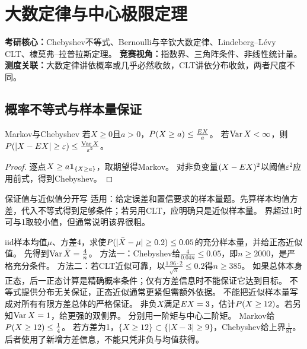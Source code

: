 \chapter{大数定律与中心极限定理}\label{ch:05}
\begin{examtip}
\textbf{考研核心：}Chebyshev不等式、Bernoulli与辛钦大数定律、Lindeberg--Lévy CLT、棣莫弗--拉普拉斯定理。
\textbf{竞赛视角：}指数界、三角阵条件、非线性统计量。
\textbf{测度关联：}大数定律讲依概率或几乎必然收敛，CLT讲依分布收敛，两者尺度不同。
\end{examtip}
\section{概率不等式与样本量保证}\label{sec:51}
\begin{theorem}{Markov与Chebyshev}
若$X\ge0$且$a>0$，$P(X\ge a)\le\frac{E X}{a}$。
若$\operatorname{Var} X<\infty$，则$P(|X-E X|\ge\varepsilon)\le\frac{\operatorname{Var} X}{\varepsilon^2}$。
\end{theorem}
\begin{proof}
逐点$X\ge a\mathbf1_{\{X\ge a\}}$，取期望得Markov。
对非负变量$(X-E X)^2$以阈值$\varepsilon^2$应用前式，得到Chebyshev。
\end{proof}
\begin{method}{保证值与近似值分开写}
适用：给定误差和置信要求的样本量题。先算样本均值方差，代入不等式得到足够条件；若另用CLT，应明确只是近似样本量。
界超过1时可与1取较小值，但通常说明该界很粗。
\end{method}
{iid样本均值$\mu$、方差4，求使$P(|\bar X-\mu|\ge0.2)\le0.05$的充分样本量，并给正态近似值。}
{先得到$\operatorname{Var}\bar X=\frac{4}{n}$。}
{方法一：Chebyshev给$\frac{4}{0.04n}\le0.05$，即$n\ge2000$，是严格充分条件。
方法二：若CLT近似可靠，以$\frac{1.96\cdot2}{\sqrt n}\le0.2$得$n\ge385$。
如果总体本身正态，后一正态计算是精确概率条件；仅有方差信息时不能保证它达到目标。}
{不等式提供分布无关保证，正态近似通常更紧但需额外依据。}
{不能把近似样本量写成对所有有限方差总体的严格保证。}
{非负$X$满足$E X=3$，估计$P(X\ge12)$。若另知$\operatorname{Var} X=1$，给更强的双侧界。}
{分别用一阶矩与中心二阶矩。}
{Markov给$P(X\ge12)\le\frac{1}{4}$。
若方差为1，$\{X\ge12\}\subset\{|X-3|\ge9\}$，Chebyshev给上界$\frac{1}{81}$。
后者使用了新增方差信息，不能只凭非负与均值获得。}

